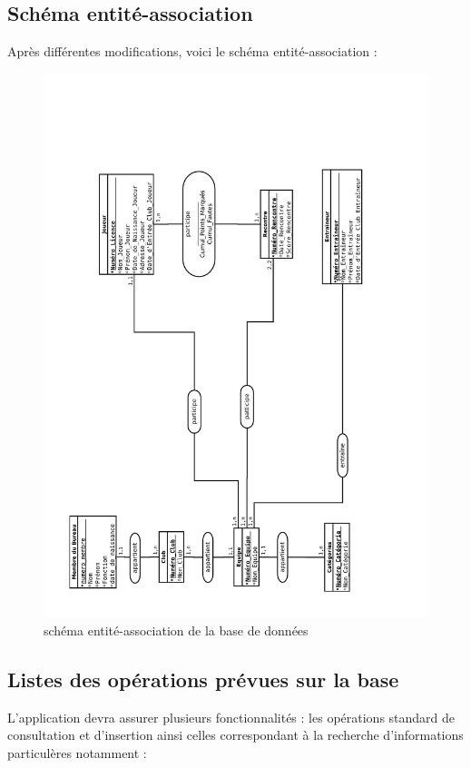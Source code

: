 \documentclass{article}
\begin{document}
\newpage

\subsection{Schéma entité-association }
Après différentes modifications, voici le schéma entité-association :
 
\begin{figure}[h!]
\centering
\includegraphics[scale=0.35 , angle = -90]{BasketBall_EA.pdf}
\caption{schéma entité-association de la base de données}
\end{figure}

\newpage
\subsection {Listes des opérations prévues sur la base}

L’application devra assurer plusieurs fonctionnalités : les opérations standard de consultation et d’insertion ainsi celles correspondant à la recherche d’informations particulères notamment : \\
\end{document}
